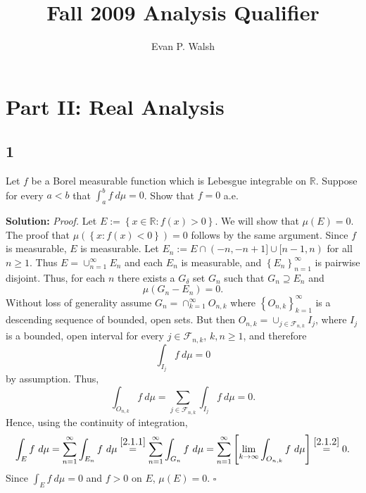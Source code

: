 \documentclass[12pt]{article}
\title{Fall 2009 Analysis Qualifier}
\author{Evan P. Walsh}
\newcounter{ProofCounter}
\newenvironment{Proof}{\stepcounter{ProofCounter}\textit{Proof.}}{\hfill$\square$}
\begin{document}

\section*{Part II: Real Analysis}

\subsection*{1}
Let $f$ be a Borel measurable function which is Lebesgue integrable on $\mathbb{R}$. Suppose for every $a < b$ that 
$\int_{a}^{b}f\ d\mu = 0$. Show that $f = 0$ a.e.

{\bf Solution:}
\begin{Proof}
Let $E := \left\{ x \in \mathbb{R} : f(x) > 0 \right\}$. We will show that $\mu(E) = 0$. The proof that $\mu\left( \left\{ x : f(x) < 0 \right\}
\right) = 0$ follows by the same argument. Since $f$ is measurable, $E$ is measurable. Let $E_{n} := E \cap (-n,-n+1]\cup[n-1,n)$ for all $n \geq 1$.
Thus $E = \cup_{n=1}^{\infty}E_{n}$ and each $E_{n}$ is measurable, and $\left\{ E_{n} \right\}_{n=1}^{\infty}$ is pairwise disjoint. 
Thus, for each $n$ there exists a $G_{\delta}$ set $G_{n}$ such that $G_{n}\supseteq
E_{n}$ and 
\begin{equation}
\mu(G_{n} - E_{n}) = 0. 
\label{2.1.1}
\end{equation}
Without loss of generality assume $G_{n} = \cap_{k=1}^{\infty}O_{n,k}$ where $\left\{ O_{n,k}
\right\}_{k=1}^{\infty}$ is a descending sequence of bounded, open sets. But then $O_{n,k} = \cup_{j\in \mathcal{F}_{n,k}}I_{j}$, where $I_{j}$ is a bounded,
open interval for every $j \in \mathcal{F}_{n,k}$, $k,n \geq 1$, and therefore 
\[ \int_{I_{j}} f\ d\mu = 0 \]
by assumption. Thus,
\begin{equation}
\int_{O_{n,k}}f\ d\mu = \sum_{j\in\mathcal{F}_{n,k}}\int_{I_{j}}f\ d\mu = 0.
\label{2.1.2}
\end{equation}
Hence, using the continuity of integration,
\[ \int_{E}f\ d\mu = \sum_{n=1}^{\infty}\int_{E_{n}}f\ d\mu \stackrel{\eqref{2.1.1}}{=} \sum_{n=1}^{\infty}\int_{G_{n}}f\ d\mu  
= \sum_{n=1}^{\infty}\left[ \lim_{k\rightarrow\infty}\int_{O_{n,k}}f\ d\mu \right] \stackrel{\eqref{2.1.2}}{=} 0. \]
Since $\int_{E}f\ d\mu = 0$ and $f > 0$ on $E$, $\mu(E) = 0$.
\end{Proof}
\end{document}
